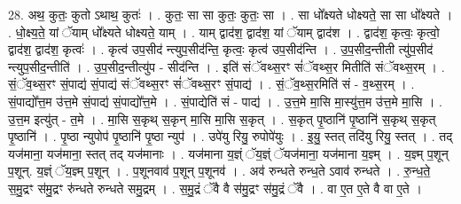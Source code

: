 \documentclass[17pt]{extarticle}
\begin{document}
28. अथ॒ कुतः॒ कुतो ऽथाथ॒ कुतः॑ । . कुतः॒ सा सा कुतः॒ कुतः॒ सा । . सा धो᳚क्ष्यते धोक्ष्यते॒ सा सा धो᳚क्ष्यते । . धो॒क्ष्य॒ते॒ यां ॅयाम् धो᳚क्ष्यते धोक्ष्यते॒ याम् । . याम् द्वाद॑श॒ द्वाद॑श॒ यां ॅयाम् द्वाद॑श । . द्वाद॑श॒ कृत्वः॒ कृत्वो॒ द्वाद॑श॒ द्वाद॑श॒ कृत्वः॑ । . कृत्व॑ उप॒सीद॑ न्त्युप॒सीद॑न्ति॒ कृत्वः॒ कृत्व॑ उप॒सीद॑न्ति । . उ॒प॒सीद॒न्तीती त्यु॑प॒सीद॑ न्त्युप॒सीद॒न्तीति॑ । . उ॒प॒सीद॒न्तीत्यु॑प - सीद॑न्ति । . इति॑ संॅवथ्स॒रꣳ सं॑ॅवथ्स॒र मितीति॑ संॅवथ्स॒रम् । . सं॒ॅव॒थ्स॒रꣳ सं॒पाद्य॑ सं॒पाद्य॑ संॅवथ्स॒रꣳ सं॑ॅवथ्स॒रꣳ सं॒पाद्य॑ । . सं॒ॅव॒थ्स॒रमिति॑ सं - व॒थ्स॒रम् । . सं॒पाद्यो᳚त्त॒म उ॑त्त॒मे सं॒पाद्य॑ सं॒पाद्यो᳚त्त॒मे । . सं॒पाद्येति॑ सं - पाद्य॑ । . उ॒त्त॒मे मा॒सि मा॒स्यु॑त्त॒म उ॑त्त॒मे मा॒सि । . उ॒त्त॒म इत्यु॑त् - त॒मे । . मा॒सि स॒कृथ् स॒कृन् मा॒सि मा॒सि स॒कृत् । . स॒कृत् पृ॒ष्ठानि॑ पृ॒ष्ठानि॑ स॒कृथ् स॒कृत् पृ॒ष्ठानि॑ । . पृ॒ष्ठा न्युपोप॑ पृ॒ष्ठानि॑ पृ॒ष्ठा न्युप॑ । . उपे॑यु रियु॒ रुपोपे॑युः । . इ॒यु॒ स्तत् तदि॑यु रियु॒ स्तत् । . तद् यज॑माना॒ यज॑माना॒ स्तत् तद् यज॑मानाः । . यज॑माना य॒ज्ञ्ं ॅय॒ज्ञ्ं ॅयज॑माना॒ यज॑माना य॒ज्ञ्म् । . य॒ज्ञ्म् प॒शून् प॒शून्. य॒ज्ञ्ं ॅय॒ज्ञ्म् प॒शून् । . प॒शूनवाव॑ प॒शून् प॒शूनव॑ । . अव॑ रुन्धते रुन्ध॒ते ऽवाव॑ रुन्धते । . रु॒न्ध॒ते॒ स॒मु॒द्रꣳ स॑मु॒द्रꣳ रु॑न्धते रुन्धते समु॒द्रम् । . स॒मु॒द्रं ॅवै वै स॑मु॒द्रꣳ स॑मु॒द्रं ॅवै । . वा ए॒त ए॒ते वै वा ए॒ते । \newline
\end{document}
